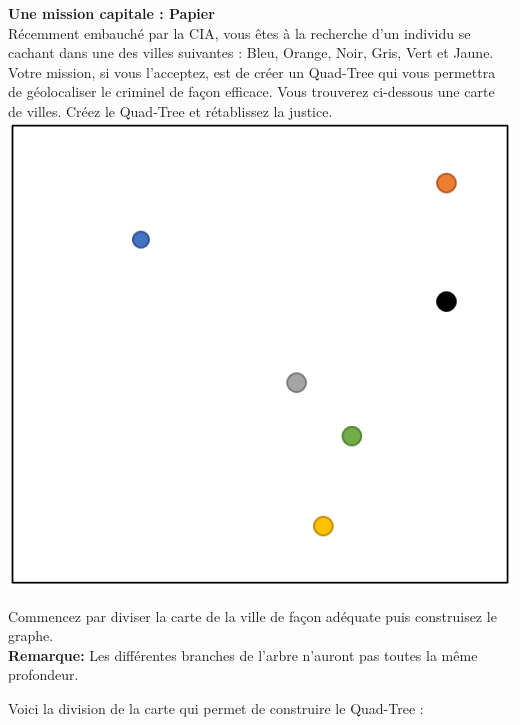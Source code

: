 \begin{Exercice}[10 minutes]\textbf{Une mission capitale : Papier \optionnel}\\

Récemment embauché par la CIA, vous êtes à la recherche d'un individu se cachant dans une des villes suivantes : Bleu, Orange, Noir, Gris, Vert et Jaune. Votre mission, si vous l'acceptez, est de créer un Quad-Tree qui vous permettra de géolocaliser le criminel de façon efficace. Vous trouverez ci-dessous une carte de villes. Créez le Quad-Tree et rétablissez la justice.\\

\includegraphics[]{resources/Quad-Tree 3.PNG}
\begin{conseil}
    Commencez par diviser la carte de la ville de façon adéquate puis construisez le graphe.\\
    
    \textbf{Remarque: }Les différentes branches de l'arbre n'auront pas toutes la même profondeur.
\end{conseil}
\begin{solution}
    Voici la division de la carte qui permet de construire le Quad-Tree :\\
    

\end{solution}
\end{Exercice}
